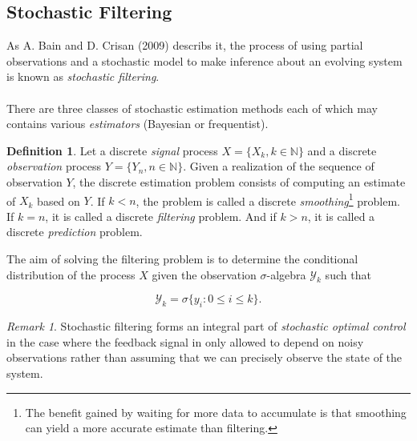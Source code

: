 \documentclass{article}
\theoremstyle{definition}
\newtheorem{definition}[thm]{Definition}
\theoremstyle{remark}
\newtheorem{remark}[thm]{Remark}
\newcommand{\filtration}[1]{\ensuremath{\mathscr{F}_{#1}}}
\newcommand{\filtrationObs}[1]{\ensuremath{\mathscr{Y}_{#1}}}
\newcommand{\measure}[1]{\ensuremath{\mathbb{#1}}}
\begin{document}







\subsection{Stochastic Filtering}

As A. Bain and D. Crisan (2009) describs it, the process of using partial observations and a stochastic model to make inference about an evolving system is known as \emph{stochastic filtering}.\\
\\
There are three classes of stochastic estimation methods each of which may contains various \emph{estimators} (Bayesian or frequentist).
\begin{definition}
Let a discrete \emph{signal} process $X=\{X_k,k\in \measure{N}\}$ and a discrete \emph{observation} process $Y=\{Y_n,n\in \measure{N}\}$. Given a realization of the sequence of observation $Y$, the discrete estimation problem consists of computing an estimate of $X_k$ based on $Y$. If $k<n$, the problem is called a discrete \emph{smoothing}\footnote{The benefit gained by waiting for more data to accumulate is that smoothing can yield a more accurate estimate than filtering.} problem. If $k=n$, it is called a discrete \emph{filtering} problem. And if $k>n$, it is called a discrete \emph{prediction} problem.
\end{definition}

The aim of solving the filtering problem is to determine the conditional distribution of the process $X$ given the observation $\sigma$-algebra \filtrationObs{k} such that

\begin{equation*}
\filtrationObs{k}=\sigma\{ y_i: 0 \leq i\leq k\}.
\end{equation*}

\begin{remark}
Stochastic filtering forms an integral part of \emph{stochastic optimal control} in the case where the feedback signal in only allowed to depend on noisy observations rather than assuming that we can precisely observe the state of the system.
\end{remark}
\end{document}
